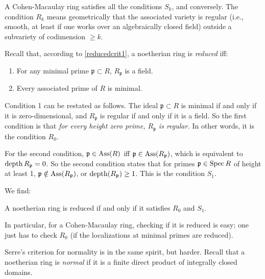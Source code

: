 A Cohen-Macaulay ring satisfies all the conditions $S_k$, and conversely. The
condition $R_k$ means geometrically that the associated variety 
is regular (i.e., smooth, at least if one works over an algebraically closed
field) outside a subvariety of codimension $\geq k$.



Recall that, according to \cref{reducedcrit1}, a noetherian ring is \textit{reduced} iff:
\begin{enumerate}
\item For any minimal prime $\mathfrak{p} \subset R$,
$R_{\mathfrak{p}}$ is a
field.
\item Every associated prime of $R$ is minimal.
\end{enumerate}

Condition 1 can be restated as follows. The ideal
$\mathfrak{p}\subset R$ is
minimal if and only if it is zero-dimensional, and $R_{\mathfrak{p}}$  is
regular if and only if it is a
field. So the first condition is that \emph{for every height
zero prime,
$R_{\mathfrak{p}}$ is regular.}
In other words, it is the condition $R_0$.

For the second condition,
$\mathfrak{p} \in
\operatorname{Ass}(R)$ iff $\mathfrak{p} \in \operatorname{Ass}(R_{\mathfrak{p}})$, which is
equivalent to
$\operatorname{depth} R_{\mathfrak{p}} = 0$. So the second condition states that for primes
$\mathfrak{p} \in \operatorname{Spec} R$ of height at least 1, $\mathfrak{p} \notin
\operatorname{Ass}(R_{\mathfrak{p}})$, or $\operatorname{depth}(R_{\mathfrak{p}}) \geq 1$. This
is the condition $S_1$.

We find:
\begin{proposition} 
A noetherian ring is reduced if and only if it satisfies $R_0$ and $S_1$.
\end{proposition} 

In particular, for a Cohen-Macaulay ring, checking if it is reduced is
easy; one just has to check $R_0$ (if the localizations at minimal primes are
reduced).


Serre's criterion for normality is in the same spirit, but harder.
Recall that
a noetherian ring is \textit{normal} if it is a finite direct
product of
integrally closed domains.

